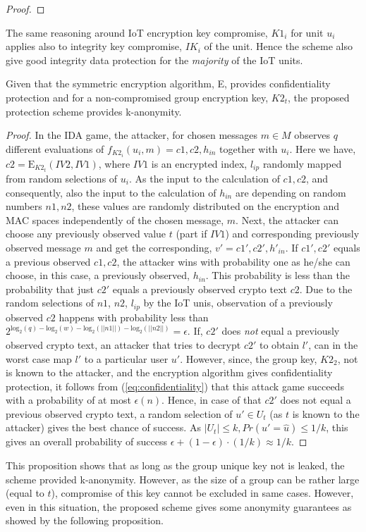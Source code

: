 {\begin{proof}
\end{proof}
The same reasoning around IoT encryption key compromise, $K1_i$ for unit $u_i$ applies also to integrity key compromise, $IK_i$ of the unit. Hence the scheme also give good integrity data protection for the \textit{majority} of the IoT units. 
\begin{prop}
\label{analysis:kanonymity}
 Given that the symmetric encryption algorithm, E, provides confidentiality protection and for a non-compromised group encryption key, $K2_t$, the proposed protection scheme provides k-anonymity.
\end{prop}
\begin{proof}
 In the IDA game, the attacker, for chosen messages $m \in M$ observes $q$ different evaluations of  $f_{K2_i}(u_i,m) = c1,c2,h_{in}$ together with $u_i$. Here we have, $c2 = \text{E}_{K2_t}(IV2,IV1)$, where $IV1$ is an encrypted index, $l_{ip}$ randomly mapped from random selections of $u_i$. As the input to the calculation of $c1,c2$, and consequently, also the input to the calculation of $h_{in}$ are depending on random numbers $n1,n2$, these values are randomly distributed on the encryption and MAC spaces independently of the chosen message, $m$. Next, the attacker can choose any previously observed value $t$ (part if $IV1$) and corresponding previously observed message $m$ and get the corresponding, $v' = c1',c2',h'_{in}$. If $c1',c2'$ equals a previous observed $c1,c2$, the attacker wins with probability one as he/she can choose, in this case, a previously observed, $h_{in}$. This probability is less than  the probability that just $c2'$ equals a previously observed crypto text $c2$.  Due to the random selections of $n1$, $n2$, $l_{ip}$ by the IoT unis, observation of a previously observed $c2$ happens with probability less than $2^{\text{log}_2(q) - \text{log}_2(w) - \text{log}_2(||n1||) -\text{log}_2(||n2||)} = \epsilon$. If, $c2'$ does \textit{not} equal a previously observed crypto text, an attacker that tries to decrypt $c2'$ to obtain $l'$, can in the worst case map $l'$ to a particular user $u'$. However, since, the group key, $K2_2$, not is known to the attacker, and the encryption algorithm gives confidentiality protection, it follows from (\ref{eq:confidentiality}) that this attack game succeeds with a probability of at most $\epsilon(n)$. Hence, in case of that $c2'$ does not equal a previous observed crypto text, a random selection of $u' \in U_t$ (as $t$ is known to the attacker) gives the best chance of success. As $|U_t| \leq k, Pr(u'= \hat{u}) \leq 1/k $, this gives an overall probability of success $\epsilon +(1-\epsilon)\cdot(1/k) \approx 1/k$.
\end{proof}
This proposition shows that as long as the group unique key not is leaked, the scheme provided k-anonymity. However, as the size of a group can be rather large  (equal to $t$), compromise of this key cannot be excluded in same cases. However, even in this situation, the proposed scheme gives some anonymity guarantees as showed by the following proposition.

}

